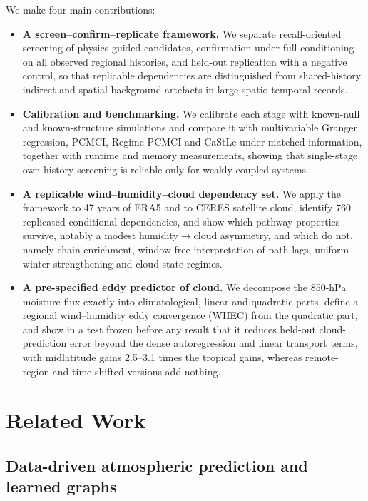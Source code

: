 \documentclass[preprint,12pt]{elsarticle}
\begin{document}
We make four main contributions:
\begin{itemize}
\item \textbf{A screen--confirm--replicate framework.} We separate recall-oriented screening of physics-guided candidates, confirmation under full conditioning on all observed regional histories, and held-out replication with a negative control, so that replicable dependencies are distinguished from shared-history, indirect and spatial-background artefacts in large spatio-temporal records.
\item \textbf{Calibration and benchmarking.} We calibrate each stage with known-null and known-structure simulations and compare it with multivariable Granger regression, PCMCI, Regime-PCMCI and CaStLe under matched information, together with runtime and memory measurements, showing that single-stage own-history screening is reliable only for weakly coupled systems.
\item \textbf{A replicable wind--humidity--cloud dependency set.} We apply the framework to 47 years of ERA5 and to CERES satellite cloud, identify 760 replicated conditional dependencies, and show which pathway properties survive, notably a modest humidity$\rightarrow$cloud asymmetry, and which do not, namely chain enrichment, window-free interpretation of path lags, uniform winter strengthening and cloud-state regimes.
\item \textbf{A pre-specified eddy predictor of cloud.} We decompose the 850-hPa moisture flux exactly into climatological, linear and quadratic parts, define a regional wind--humidity eddy convergence (WHEC) from the quadratic part, and show in a test frozen before any result that it reduces held-out cloud-prediction error beyond the dense autoregression and linear transport terms, with midlatitude gains 2.5--3.1 times the tropical gains, whereas remote-region and time-shifted versions add nothing.
\end{itemize}

\section{Related Work}
\label{sec:related}

\subsection{Data-driven atmospheric prediction and learned graphs}
\end{document}
